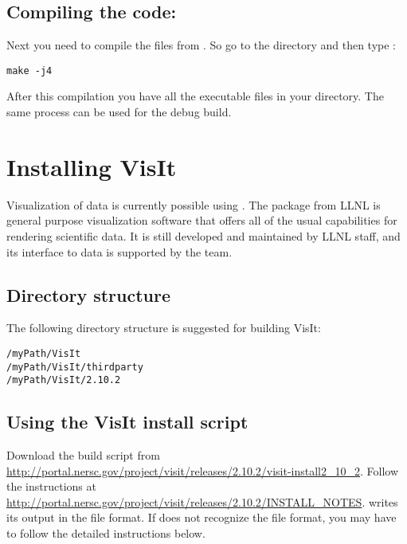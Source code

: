 \documentclass[11pt,fleqn]{book} %
\begin{document}
\section{Compiling the code:}
Next you need to compile the files from . So go to the  directory and then type : 
\begin{lstlisting}[backgroundcolor=\color{background}]
make -j4
\end{lstlisting}

After this compilation you have all the executable files in your  directory.
The same process can  be used for the debug build.

\chapter{Installing VisIt}
Visualization of \Vaango data is currently possible using
\Visit. The \Visit package from LLNL is general purpose
visualization software that offers all of the usual capabilities for
rendering scientific data.  It is still developed and maintained by
LLNL staff, and its interface to \Vaango data is supported by
the \Uintah team. 

\section{Directory structure}
The following directory structure is suggested for building VisIt:

\begin{lstlisting}[backgroundcolor=\color{background}]
/myPath/VisIt
/myPath/VisIt/thirdparty
/myPath/VisIt/2.10.2
\end{lstlisting}

\section{Using the VisIt install script}
Download the build script from \\
\url{http://portal.nersc.gov/project/visit/releases/2.10.2/visit-install2_10_2}.
Follow the instructions at \url{http://portal.nersc.gov/project/visit/releases/2.10.2/INSTALL_NOTES}.
\Vaango writes its output in the \Uintah file format.  If \Visit does not recognize the
\Uintah file format, you may have to follow the detailed instructions below.
\end{document}
